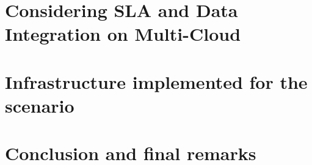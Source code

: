 \documentclass{llncs}
\begin{document}

  



 



\section{Considering SLA and Data Integration on Multi-Cloud}

\section{Infrastructure implemented for the scenario}

\section{Conclusion and final remarks}\label{sec:conc}




\end{document}
